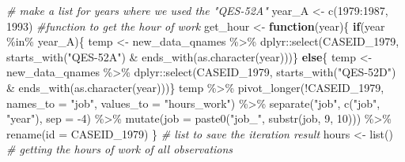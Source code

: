 \documentclass{article}
\newenvironment{Shaded}{\begin{snugshade}}{\end{snugshade}}
\newcommand{\AttributeTok}[1]{\textcolor[rgb]{0.77,0.63,0.00}{#1}}
\newcommand{\CommentTok}[1]{\textcolor[rgb]{0.56,0.35,0.01}{\textit{#1}}}
\newcommand{\ControlFlowTok}[1]{\textcolor[rgb]{0.13,0.29,0.53}{\textbf{#1}}}
\newcommand{\DecValTok}[1]{\textcolor[rgb]{0.00,0.00,0.81}{#1}}
\newcommand{\FunctionTok}[1]{\textcolor[rgb]{0.00,0.00,0.00}{#1}}
\newcommand{\NormalTok}[1]{#1}
\newcommand{\OtherTok}[1]{\textcolor[rgb]{0.56,0.35,0.01}{#1}}
\newcommand{\SpecialCharTok}[1]{\textcolor[rgb]{0.00,0.00,0.00}{#1}}
\newcommand{\StringTok}[1]{\textcolor[rgb]{0.31,0.60,0.02}{#1}}
\begin{document}
\begin{Shaded}
\begin{Highlighting}[]
\CommentTok{\# make a list for years where we used the "QES{-}52A"}
\NormalTok{year\_A }\OtherTok{\textless{}{-}} \FunctionTok{c}\NormalTok{(}\DecValTok{1979}\SpecialCharTok{:}\DecValTok{1987}\NormalTok{, }\DecValTok{1993}\NormalTok{)}
\CommentTok{\#function to get the hour of work}
\NormalTok{get\_hour }\OtherTok{\textless{}{-}} \ControlFlowTok{function}\NormalTok{(year)\{}
  \ControlFlowTok{if}\NormalTok{(year }\SpecialCharTok{\%in\%}\NormalTok{ year\_A)\{}
\NormalTok{    temp }\OtherTok{\textless{}{-}}\NormalTok{ new\_data\_qnames }\SpecialCharTok{\%\textgreater{}\%}
\NormalTok{      dplyr}\SpecialCharTok{::}\FunctionTok{select}\NormalTok{(CASEID\_1979,}
                    \FunctionTok{starts\_with}\NormalTok{(}\StringTok{"QES{-}52A"}\NormalTok{) }\SpecialCharTok{\&}
                      \FunctionTok{ends\_with}\NormalTok{(}\FunctionTok{as.character}\NormalTok{(year)))\}}
  \ControlFlowTok{else}\NormalTok{\{}
\NormalTok{    temp }\OtherTok{\textless{}{-}}\NormalTok{ new\_data\_qnames }\SpecialCharTok{\%\textgreater{}\%}
\NormalTok{      dplyr}\SpecialCharTok{::}\FunctionTok{select}\NormalTok{(CASEID\_1979,}
                    \FunctionTok{starts\_with}\NormalTok{(}\StringTok{"QES{-}52D"}\NormalTok{) }\SpecialCharTok{\&}
                      \FunctionTok{ends\_with}\NormalTok{(}\FunctionTok{as.character}\NormalTok{(year)))\}}
\NormalTok{  temp }\SpecialCharTok{\%\textgreater{}\%}
    \FunctionTok{pivot\_longer}\NormalTok{(}\SpecialCharTok{!}\NormalTok{CASEID\_1979,}
                 \AttributeTok{names\_to =} \StringTok{"job"}\NormalTok{,}
                 \AttributeTok{values\_to =} \StringTok{"hours\_work"}\NormalTok{) }\SpecialCharTok{\%\textgreater{}\%}
    \FunctionTok{separate}\NormalTok{(}\StringTok{"job"}\NormalTok{, }\FunctionTok{c}\NormalTok{(}\StringTok{"job"}\NormalTok{, }\StringTok{"year"}\NormalTok{), }\AttributeTok{sep =} \SpecialCharTok{{-}}\DecValTok{4}\NormalTok{) }\SpecialCharTok{\%\textgreater{}\%}
    \FunctionTok{mutate}\NormalTok{(}\AttributeTok{job =} \FunctionTok{paste0}\NormalTok{(}\StringTok{"job\_"}\NormalTok{, }\FunctionTok{substr}\NormalTok{(job, }\DecValTok{9}\NormalTok{, }\DecValTok{10}\NormalTok{))) }\SpecialCharTok{\%\textgreater{}\%}
    \FunctionTok{rename}\NormalTok{(}\AttributeTok{id =}\NormalTok{ CASEID\_1979)}
\NormalTok{\}}
\CommentTok{\# list to save the iteration result}
\NormalTok{hours }\OtherTok{\textless{}{-}} \FunctionTok{list}\NormalTok{()}
\CommentTok{\# getting the hours of work of all observations}

\end{Highlighting}
\end{Shaded}
\end{document}
